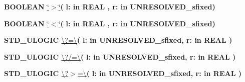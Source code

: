 \begin{DoxyCompactItemize}
\item 
{\bfseries {\bfseries \textcolor{comment}{B\+O\+O\+L\+E\+A\+N}\textcolor{vhdlchar}{ }}} \hyperlink{classfixed__pkg_ac6c82329bf849852be997a3d0a737cf9}{\char`\"{}$>$\char`\"{}}{\bfseries  ( }{\bfseries \textcolor{vhdlchar}{l\+: }\textcolor{stringliteral}{in }{\bfseries \textcolor{comment}{R\+E\+A\+L}\textcolor{vhdlchar}{ }}}{\bfseries  , \textcolor{vhdlchar}{r\+: }\textcolor{stringliteral}{in }\textcolor{vhdlchar}{U\+N\+R\+E\+S\+O\+L\+V\+E\+D\+\_\+sfixed}}{\bfseries  )} 
\item 
{\bfseries {\bfseries \textcolor{comment}{B\+O\+O\+L\+E\+A\+N}\textcolor{vhdlchar}{ }}} \hyperlink{classfixed__pkg_a5d059cf3277e3585e4f3f076db10b273}{\char`\"{}$<$\char`\"{}}{\bfseries  ( }{\bfseries \textcolor{vhdlchar}{l\+: }\textcolor{stringliteral}{in }{\bfseries \textcolor{comment}{R\+E\+A\+L}\textcolor{vhdlchar}{ }}}{\bfseries  , \textcolor{vhdlchar}{r\+: }\textcolor{stringliteral}{in }\textcolor{vhdlchar}{U\+N\+R\+E\+S\+O\+L\+V\+E\+D\+\_\+sfixed}}{\bfseries  )} 
\item 
{\bfseries {\bfseries \textcolor{comment}{S\+T\+D\+\_\+\+U\+L\+O\+G\+I\+C}\textcolor{vhdlchar}{ }}} \hyperlink{classfixed__pkg_a69151531d87456d952c2073704fa1779}{\textbackslash{}?=\textbackslash{}}{\bfseries  ( }{\bfseries \textcolor{vhdlchar}{l\+: }\textcolor{stringliteral}{in }\textcolor{vhdlchar}{U\+N\+R\+E\+S\+O\+L\+V\+E\+D\+\_\+sfixed}}{\bfseries  , \textcolor{vhdlchar}{r\+: }\textcolor{stringliteral}{in }{\bfseries \textcolor{comment}{R\+E\+A\+L}\textcolor{vhdlchar}{ }}}{\bfseries  )} 
\item 
{\bfseries {\bfseries \textcolor{comment}{S\+T\+D\+\_\+\+U\+L\+O\+G\+I\+C}\textcolor{vhdlchar}{ }}} \hyperlink{classfixed__pkg_a172a73302b09f0d298b93ecda8c5e976}{\textbackslash{}?/=\textbackslash{}}{\bfseries  ( }{\bfseries \textcolor{vhdlchar}{l\+: }\textcolor{stringliteral}{in }\textcolor{vhdlchar}{U\+N\+R\+E\+S\+O\+L\+V\+E\+D\+\_\+sfixed}}{\bfseries  , \textcolor{vhdlchar}{r\+: }\textcolor{stringliteral}{in }{\bfseries \textcolor{comment}{R\+E\+A\+L}\textcolor{vhdlchar}{ }}}{\bfseries  )} 
\item 
{\bfseries {\bfseries \textcolor{comment}{S\+T\+D\+\_\+\+U\+L\+O\+G\+I\+C}\textcolor{vhdlchar}{ }}} \hyperlink{classfixed__pkg_a3adee8c12e5c0bb76fc3e1a493284a27}{\textbackslash{}?$>$=\textbackslash{}}{\bfseries  ( }{\bfseries \textcolor{vhdlchar}{l\+: }\textcolor{stringliteral}{in }\textcolor{vhdlchar}{U\+N\+R\+E\+S\+O\+L\+V\+E\+D\+\_\+sfixed}}{\bfseries  , \textcolor{vhdlchar}{r\+: }\textcolor{stringliteral}{in }{\bfseries \textcolor{comment}{R\+E\+A\+L}\textcolor{vhdlchar}{ }}}{\bfseries  )} 

\end{DoxyCompactItemize}
